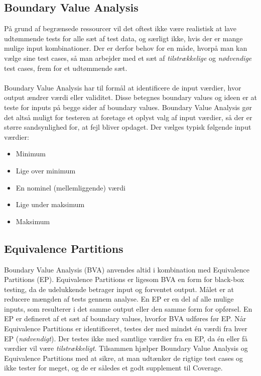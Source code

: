 \documentclass[a4paper,12pt,fleqn,oneside]{article}
\begin{document}
\subsection{Boundary Value Analysis}
På grund af begrænsede ressourcer vil det oftest ikke være realistisk at lave udtømmende tests for alle sæt af test data, og særligt ikke, hvis der er mange mulige input kombinationer. Der er derfor behov for en måde, hvorpå man kan vælge sine test cases, så man arbejder med et sæt af \textit{tilstrækkelige} og \textit{nødvendige} test cases, frem for et udtømmende sæt. \\\\Boundary Value Analysis har til formål at identificere de input værdier, hvor output ændrer værdi eller validitet. Disse betegnes boundary values og ideen er at teste for inputs på begge sider af boundary values. Boundary Value Analysis gør det altså muligt for testeren at foretage et oplyst valg af input værdier, så der er større sandsynlighed for, at fejl bliver opdaget. Der vælges typisk følgende input værdier:

\begin{itemize}
    \item Minimum
    \item Lige over minimum
    \item En nominel (mellemliggende) værdi
    \item Lige under maksimum
    \item Maksimum
\end{itemize}

\subsection{Equivalence Partitions}
Boundary Value Analysis (BVA) anvendes altid i kombination med Equivalence Partitions (EP). Equivalence Partitions er ligesom BVA en form for black-box testing, da de udelukkende betrager input og forventet output. Målet er at reducere mængden af tests gennem analyse. En EP er en del af alle mulige inputs, som resulterer i det samme output eller den samme form for opførsel. En EP er defineret af et sæt af boundary values, hvorfor BVA udføres før EP. Når Equivalence Partitions er identificeret, testes der med mindst én værdi fra hver EP (\textit{nødvendigt}). Der testes ikke med samtlige værdier fra en EP, da én eller få værdier vil være \textit{tilstrækkeligt}. Tilsammen hjælper Boundary Value Analysis og Equivalence Partitions med at sikre, at man udtænker de rigtige test cases og ikke tester for meget, og de er således et godt supplement til Coverage.
\end{document}

